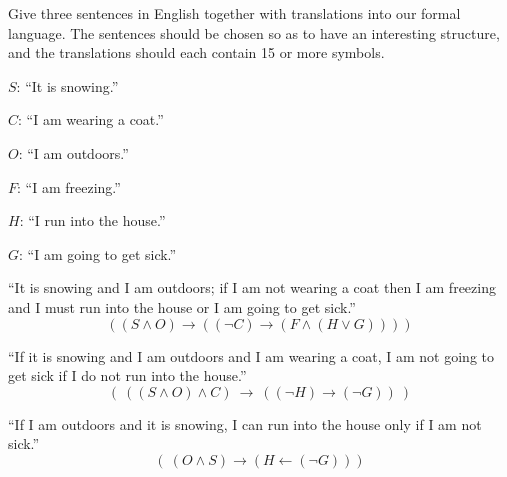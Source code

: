 
\begin{problem}
  Give three sentences in English together with translations into our formal language. The sentences should be chosen so as to have an interesting structure, and the translations should each contain 15 or
  more symbols.
\end{problem}
\begin{Answer}
  \begin{enumroman}
    \item $S$: ``It is snowing.''
    \item $C$: ``I am wearing a coat.''
    \item $O$: ``I am outdoors.''
    \item $F$: ``I am freezing.''
    \item $H$: ``I run into the house.''
    \item $G$: ``I am going to get sick.''
  \end{enumroman}

  \begin{enumroman}
    \item ``It is snowing and I am outdoors; if I am not wearing a coat
      then I am freezing and I must run into the house or I am going to get sick.''
      \[ ((S \land O) \rightarrow ((\lnot C) \rightarrow  (F \land (H \lor G)))) \]
  
    \item ``If it is snowing and I am outdoors and I am wearing a coat,
      I am not going to get sick if I do not run into the house.''
      \[ (\ ((S \land O) \land C) \ \rightarrow \ ((\lnot H) \rightarrow (\lnot G)) \ ) \]

    \item ``If I am outdoors and it is snowing, I can run into the house only if I am not sick.''
      \[ (\ (O \land S) \rightarrow (H \leftarrow (\lnot G))) \]
    \end{enumroman}
\end{Answer}
  